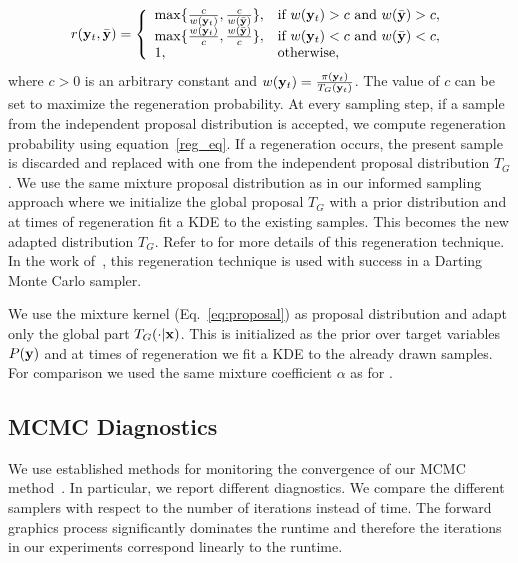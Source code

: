 \begin{equation}
r(\mathbf{y}_t,\bar{\mathbf{y}}) = \left\{
  \begin{array}{ll}
    \max\{ \frac{c}{w(\mathbf{y}_t)}, \frac{c}{w(\bar{\mathbf{y}})}  \},& \textrm{if $w(\mathbf{y}_t)>c$ and $w(\bar{\mathbf{y}})>c$},\\
    \max\{ \frac{w(\mathbf{y}_t)}{c}, \frac{w(\bar{\mathbf{y}})}{c}  \},& \textrm{if $w(\mathbf{y}_t)<c$ and $w(\bar{\mathbf{y}})<c$},\\
    1,    & \textrm{otherwise},
  \end{array}
\right.
\label{reg_eq}
\end{equation}
%
where $c > 0$ is an arbitrary constant and $w(\mathbf{y}_t) =
\frac{\pi(\mathbf{y}_t)}{T_G(\mathbf{y}_t)}$. The value of $c$ can be set to maximize the
regeneration probability. At every sampling step, if a sample from the
independent proposal distribution is accepted, we compute regeneration
probability using equation~\ref{reg_eq}. If a regeneration occurs,
the present sample is discarded and replaced with one from the
independent proposal distribution $T_G$. We use the same mixture
proposal distribution as in our informed sampling approach where we
initialize the global proposal $T_G$ with a prior distribution and at
times of regeneration fit a KDE to the existing samples. This becomes
the new adapted distribution $T_G$. Refer to
\cite{mykland1995regeneration} for more details of this regeneration
technique. In the work of~\cite{ahn2013distributed}, this regeneration
technique is used with success in a Darting Monte Carlo sampler.

We use the mixture kernel (Eq.~\ref{eq:proposal}) as proposal distribution and
adapt only the global part $T_G(\cdot|\mathbf{x})$. This is initialized as
the prior over target variables $P(\mathbf{y})$ and at times of regeneration we fit a KDE to
the already drawn samples. For comparison we used the same mixture coefficient
$\alpha$ as for \MIXLMH.


\subsection{MCMC Diagnostics}\label{sec:mcmcdiagnostics}
We use established methods for monitoring the convergence of our MCMC
method~\cite{kass1998roundtable,flegal2008mcmcdiagnostics}. In
particular, we report different diagnostics. We compare the different
samplers with respect to the number of iterations instead of time. The
forward graphics process significantly dominates the runtime and
therefore the iterations in our experiments correspond linearly to the
runtime.

